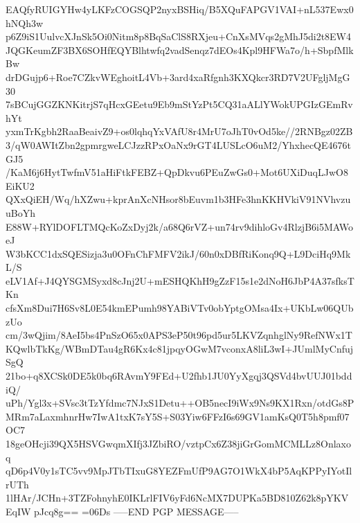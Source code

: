 EAQfyRUIGYHw4yLKFzCOGSQP2nyxBSHiq/B5XQuFAPGV1VAI+nL537Ewx0hNQh3w
p6Z9iS1UulvcXJnSk5Oi0Nitm8p8BqSaClS8RXjeu+CnXsMVqs2gMhJ5di2t8EW4
JQGKeumZF3BX6SOHfEQYBlhtwfq2vadSenqz7dEOs4Kpl9HFWa7o/h+SbpfMlkBw
drDGujp6+Roe7CZkvWEghoitL4Vb+3ard4xaRfgnh3KXQkcr3RD7V2UFgljMgG30
7sBCujGGZKNKitrjS7qHcxGEetu9Eb9mStYzPt5CQ31aALlYWokUPGIzGEmRvhYt
yxmTrKgbh2RaaBeaivZ9+os0lqhqYxVAfU8r4MrU7oJhT0vOd5ke//2RNBgz02ZB
3/qW0AWItZbn2gpmrgweLCJzzRPxOaNx9rGT4LUSLcO6uM2/YhxhecQE4676tGJ5
/KaM6j6HytTwfmV51aHiFtkFEBZ+QpDkvu6PEuZwGs0+Mot6UXiDuqLJwO8EiKU2
QXxQiEH/Wq/hXZwu+kprAnXcNHsor8bEuvm1b3HFe3hnKKHVkiV91NVhvzuuBoYh
E88W+RYlDOFLTMQcKoZxDyj2k/a68Q6rVZ+un74rv9dihloGv4RlzjB6i5MAWoeJ
W3bKCC1dxSQESizja3u0OFnChFMFV2ikJ/60n0xDBfRiKonq9Q+L9DciHq9MkL/S
eLV1Af+J4QYSGMSyxd8cJnj2U+mESHQKhH9gZzF15s1e2dNoH6JbP4A37sfksTKn
cfsXm8Dui7H6Sv8L0E54kmEPumh98YABiVTv0obYptgOMsa4Ix+UKbLw06QUbzUo
cm/3wQjim/8AeI5bs4PnSzO65x0APS3eP50t96pd5ur5LKVZqnhglNy9RefNWx1T
KQwlbTkKg/WBmDTau4gR6Kx4c81jpqyOGwM7vconxA8liL3wI+JUmlMyCnfujSgQ
21bo+q8XCSk0DE5k0bq6RAvmY9FEd+U2fhb1JU0YyXgqj3QSVd4bvUUJ01bddiQ/
uPh/Ygl3x+SVsc3tTzYfdmc7NJxS1Detu++OB5necI9iWx9Ns9KX1Rxn/otdGs8P
MRm7aLaxmhnrHw7IwA1txK7sY5S+S03Yiw6FFzI6s69GV1amKsQ0T5h8pmf07OC7
18geOHcji39QX5HSVGwqmXIfj3JZbiRO/vztpCx6Z38jiGrGomMCMLLz8Onlaxoq
qD6p4V0y1sTC5vv9MpJTbTIxuG8YEZFmUfP9AG7O1WkX4bP5AqKPPyIYotIlrUTh
1lHAr/JCHn+3TZFohnyhE0IKLrlFIV6yFd6NcMX7DUPKa5BD810Z62k8pYKVEqIW
pJcq8g==
=06Ds
-----END PGP MESSAGE-----
